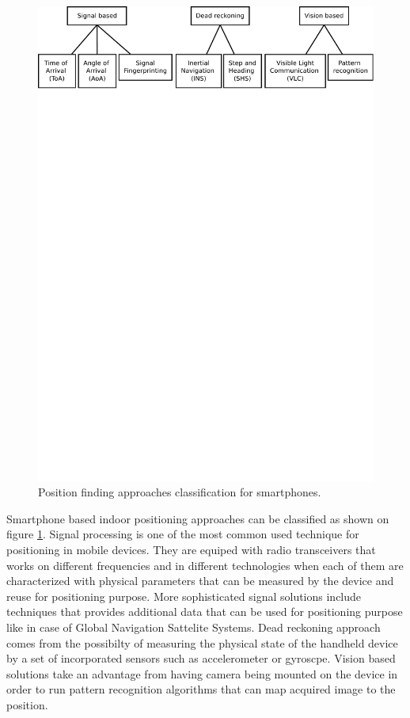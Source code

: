 \documentclass[../main.tex]{subfiles}
\begin{document}
\begin{figure}[!htbp]
\includegraphics[width=\textwidth, trim={0 23cm 0 0},clip]{pictures/smartphone_localization_approaches.pdf}
\centering
\caption{Position finding approaches classification for smartphones.\cite{inertial_navi_velocity_model}}
\label{fig:smartphone_localization_approaches}
\end{figure}

Smartphone based indoor positioning approaches can be classified as shown on figure \ref{fig:smartphone_localization_approaches}. Signal processing is one of the most common used technique for positioning in mobile devices. They are equiped with radio transceivers that works on different frequencies and in different technologies when each of them are characterized with physical parameters that can be measured by the device and reuse for positioning purpose. More sophisticated signal solutions include techniques that provides additional data that can be used for positioning purpose like in case of Global Navigation Sattelite Systems. Dead reckoning approach comes from the possibilty of measuring the physical state of the handheld device by a set of incorporated sensors such as accelerometer or gyroscpe. Vision based solutions take an advantage from having camera being mounted on the device in order to run pattern recognition algorithms that can map acquired image to the position.
\end{document}
